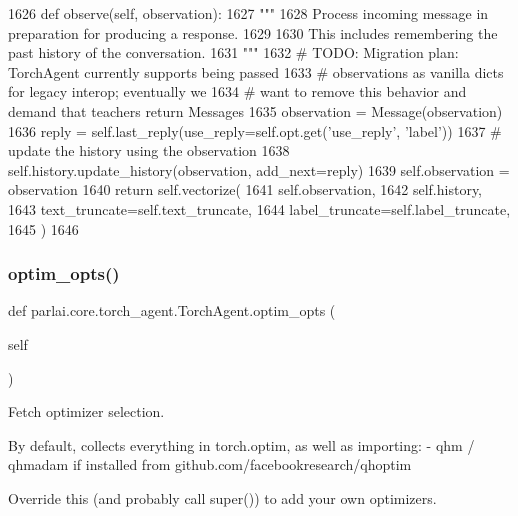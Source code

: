 \begin{DoxyCode}
1626     \textcolor{keyword}{def }observe(self, observation):
1627         \textcolor{stringliteral}{"""}
1628 \textcolor{stringliteral}{        Process incoming message in preparation for producing a response.}
1629 \textcolor{stringliteral}{}
1630 \textcolor{stringliteral}{        This includes remembering the past history of the conversation.}
1631 \textcolor{stringliteral}{        """}
1632         \textcolor{comment}{# TODO: Migration plan: TorchAgent currently supports being passed}
1633         \textcolor{comment}{# observations as vanilla dicts for legacy interop; eventually we}
1634         \textcolor{comment}{# want to remove this behavior and demand that teachers return Messages}
1635         observation = Message(observation)
1636         reply = self.last\_reply(use\_reply=self.opt.get(\textcolor{stringliteral}{'use\_reply'}, \textcolor{stringliteral}{'label'}))
1637         \textcolor{comment}{# update the history using the observation}
1638         self.history.update\_history(observation, add\_next=reply)
1639         self.observation = observation
1640         \textcolor{keywordflow}{return} self.vectorize(
1641             self.observation,
1642             self.history,
1643             text\_truncate=self.text\_truncate,
1644             label\_truncate=self.label\_truncate,
1645         )
1646 
\end{DoxyCode}
\mbox{\label{classparlai_1_1core_1_1torch__agent_1_1TorchAgent_a9c622b8ed5a811841f30fe98cc297cde}} 
\subsubsection{\texorpdfstring{optim\+\_\+opts()}{optim\_opts()}}
{\footnotesize\ttfamily def parlai.\+core.\+torch\+\_\+agent.\+Torch\+Agent.\+optim\+\_\+opts (\begin{DoxyParamCaption}\item[{}]{self }\end{DoxyParamCaption})}

\begin{DoxyVerb}Fetch optimizer selection.

By default, collects everything in torch.optim, as well as importing:
- qhm / qhmadam if installed from github.com/facebookresearch/qhoptim

Override this (and probably call super()) to add your own optimizers.
\end{DoxyVerb}
 

